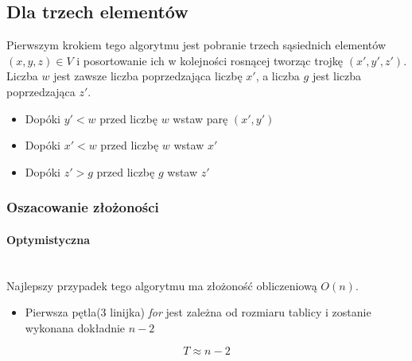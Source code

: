 \subsection{Dla trzech elementów}
Pierwszym krokiem tego algorytmu jest pobranie trzech sąsiednich elementów $(x,y,z) \in V$ i posortowanie ich w kolejności rosnącej tworząc trojkę $(x',y',z')$. Liczba $w$ jest zawsze liczba poprzedzająca liczbę $x'$, a liczba $g$ jest liczba poprzedzająca $z'$.
\begin{itemize}
\item Dopóki $y'<w$ przed liczbę $w$ wstaw parę $(x',y')$
\item Dopóki $x'<w$ przed liczbę $w$ wstaw $x'$
\item Dopóki $z'>g$ przed liczbę $g$ wstaw $z'$
\end{itemize}
\subsubsection{Oszacowanie złożoności}
\paragraph{Optymistyczna}\mbox{}\\
Najlepszy przypadek tego algorytmu ma złożoność obliczeniową $O(n)$. 
\begin{itemize}
\item Pierwsza pętla(3 linijka) \textit{for} jest zależna od rozmiaru tablicy i zostanie wykonana dokładnie $n-2$
\end{itemize}

\begin{equation*}
T \approx n - 2
\end{equation*}
\wyjT
